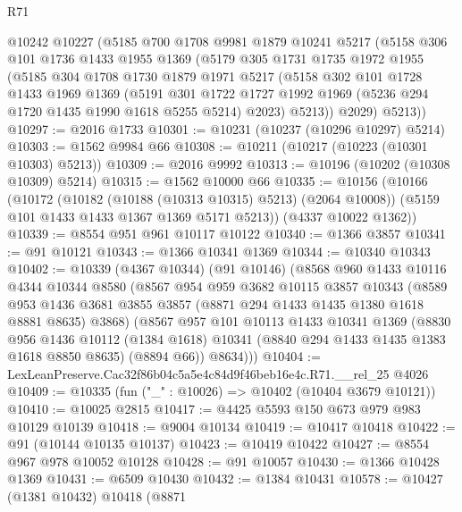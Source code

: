 \begin{lexlean}{R71}
\begin{coremodule}
    @10242
    @10227
    (@5185
      @700
      @1708
      @9981
      @1879
      @10241
      @5217
      (@5158
        @306
        @101
        @1736
        @1433
        @1955
        @1369
        (@5179
          @305
          @1731
          @1735
          @1972
          @1955
          (@5185
            @304
            @1708
            @1730
            @1879
            @1971
            @5217
            (@5158
              @302
              @101
              @1728
              @1433
              @1969
              @1369
              (@5191
                @301
                @1722
                @1727
                @1992
                @1969
                (@5236 @294 @1720 @1435 @1990 @1618 @5255 @5214)
                @2023)
              @5213))
          @2029)
        @5213))
@10297 := @2016 @1733
@10301 := @10231 (@10237 (@10296 @10297) @5214)
@10303 := @1562 @9984 @66
@10308 := @10211 (@10217 (@10223 (@10301 @10303) @5213))
@10309 := @2016 @9992
@10313 := @10196 (@10202 (@10308 @10309) @5214)
@10315 := @1562 @10000 @66
@10335 := @10156
    (@10166
      (@10172
        (@10182 (@10188 (@10313 @10315) @5213) (@2064 @10008))
        (@5159 @101 @1433 @1433 @1367 @1369 @5171 @5213))
      (@4337 @10022 @1362))
@10339 := @8554 @951 @961 @10117 @10122
@10340 := @1366 @3857
@10341 := @91 @10121
@10343 := @1366 @10341 @1369
@10344 := @10340 @10343
@10402 := @10339
    (@4367 @10344)
    (@91 @10146)
    (@8568
      @960
      @1433
      @10116
      @4344
      @10344
      @8580
      (@8567
        @954
        @959
        @3682
        @10115
        @3857
        @10343
        (@8589 @953 @1436 @3681 @3855 @3857 (@8871 @294 @1433 @1435 @1380 @1618 @8881 @8635) @3868)
        (@8567
          @957
          @101
          @10113
          @1433
          @10341
          @1369
          (@8830
            @956
            @1436
            @10112
            (@1384 @1618)
            @10341
            (@8840 @294 @1433 @1435 @1383 @1618 @8850 @8635)
            (@8894 @66))
          @8634)))
@10404 := LexLeanPreserve.Cac32f86b04c5a5e4c84d9f46beb16e4c.R71.__rel_25 @4026
@10409 := @10335 (fun ("_" : @10026) => @10402 (@10404 @3679 @10121))
@10410 := @10025 @2815
@10417 := @4425 @5593 @150 @673 @979 @983 @10129 @10139
@10418 := @9004 @10134
@10419 := @10417 @10418
@10422 := @91 (@10144 @10135 @10137)
@10423 := @10419 @10422
@10427 := @8554 @967 @978 @10052 @10128
@10428 := @91 @10057
@10430 := @1366 @10428 @1369
@10431 := @6509 @10430
@10432 := @1384 @10431
@10578 := @10427
    (@1381 @10432)
    @10418
    (@8871

\end{coremodule}
\end{lexlean}
